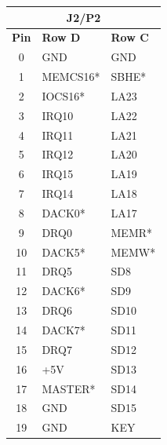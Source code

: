 \documentclass[12pt]{article}
\begin{document}
\begin{enumerate}
		\begin{table}[h!]
			\centering
			\label{tab:pc104_pinout}
			\small %
			
			\begin{minipage}{.48\textwidth}
				\centering
				\begin{tabular}{|c|l|l|}
					\hline %
					\multicolumn{3}{|c|}{\textbf{J2/P2}} \\
					\hline %
					\textbf{Pin} & \textbf{Row D} & \textbf{Row C} \\
					\hline 
					0 & GND & GND \\
					\hline 
					1 & MEMCS16* & SBHE* \\
					\hline 
					2 & IOCS16* & LA23 \\
					\hline 
					3 & IRQ10 & LA22 \\
					\hline 
					4 & IRQ11 & LA21 \\
					\hline 
					5 & IRQ12 & LA20 \\
					\hline
					6 & IRQ15 & LA19 \\
					\hline 
					7 & IRQ14 & LA18 \\
					\hline 
					8 & DACK0* & LA17 \\
					\hline 
					9 & DRQ0 & MEMR* \\
					\hline 
					10 & DACK5* & MEMW* \\
					\hline 
					11 & DRQ5 & SD8 \\
					\hline 
					12 & DACK6* & SD9 \\
					\hline 
					13 & DRQ6 & SD10 \\
					\hline 
					14 & DACK7* & SD11 \\
					\hline 
					15 & DRQ7 & SD12 \\
					\hline 
					16 & +5V & SD13 \\
					\hline 
					17 & MASTER* & SD14 \\
					\hline 
					18 & GND & SD15 \\
					\hline 
					19 & GND & KEY \\
					\hline 
				\end{tabular}
			\end{minipage}
			\hfill %
			\begin{minipage}{.48\textwidth}
				\centering
				\begin{tabular}{|c|l|l|}

\end{tabular}
\end{minipage}
\end{table}
\end{enumerate}
\end{document}
